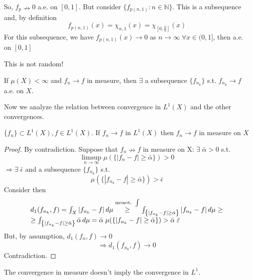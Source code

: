 \begin{remark}
    So, \(f_p \nrightarrow 0\) a.e. on \([0,1]\). But consider \( \{ f_{p(n,1)}: n \in \mathbb{N} \} \). 
    This is a subsequence and, by definition 
    \[ 
        f_{p(n, 1)}(x) = \chi_{n, 1}(x)= \chi_{\left[0, \frac{0}{n} \right]}(x) 
    \] 
    For this subsequence, we have \( f_{p(n,1)}(x) \rightarrow 0 \) as \( n \to\infty \; \forall x \in (0, 1] \), then a.e. on \(\left[0, 1\right]\)
    
    This is not random!

\end{remark}

\begin{proposition}
    If \(\mu(X) < \infty \) and \(f_n \rightarrow f \) in measure, then \(\exists\) a subsequence \(\{f_{n_k} \}\) s.t. \(f_{n_k} \to f \) a.e. on \(X\).
\end{proposition}
Now we analyze the relation between convergence in \(L^1(X)\) and the other convergences.

\begin{theorem}
    \( \{f_n\} \subset L^1(X), f \in L^1(X) \). If \(f_n \rightarrow f \) in \(L^1(X)\) then \(f_n \rightarrow f \) in measure on \(X\)
\end{theorem}
\begin{proof}
    By contradiction. Suppose that \(f_n \nrightarrow f \) in measure on X: 
    \( \exists \; \bar{\alpha} > 0 \) s.t. 
    \[ 
        \limsup_{n\to\infty} \mu(\{ |f_n-f| \geq \bar{\alpha} \}) > 0 
    \]
    \(\Rightarrow \exists \; \bar{\epsilon}\) and a subsequence \( \{ f_{n_k} \} \) s.t.
    \[ 
        \mu(\{ |f_{n_k}-f| \geq \bar{\alpha} \}) > \bar{\epsilon} 
    \]
    Consider then 
    \[  
        \begin{array}{l}
        d_1(f_{n_k}, f) 
        = \int_X |f_{n_k} - f| \, d\mu  
        \overset{\text{monot. } \int}{\geq} \int_{\left\{|f_{n_k}-f|\geq \bar{\alpha}  \right\}} \abs{f_{n_k} -f} \, d\mu  \geq\\
        \geq \int_{\left\{|f_{n_k}-f|\geq \bar{\alpha}  \right\}} \bar{\alpha} \, d\mu 
        = \bar{\alpha} \; \mu (\{|f_{n_k } - f| \geq \bar{\alpha}\}) 
        > \bar{\alpha} \; \bar{\varepsilon}    
        \end{array}
    \]
    But, by assumption, \(d_1(f_n, f) \rightarrow 0\)
    \[ 
        \Rightarrow d_1(f_{n_k}, f) \rightarrow 0 
    \] 
    Contradiction.
\end{proof}

\begin{remark}
    The convergence in measure doesn't imply the convergence in \(L^1\).
\end{remark}

